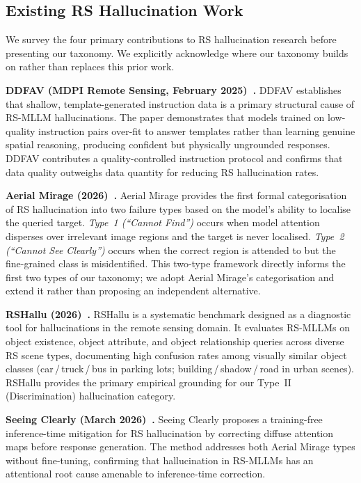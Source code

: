 \subsection{Existing RS Hallucination Work}\label{sec7:prior}

We survey the four primary contributions to RS hallucination research before
presenting our taxonomy. We explicitly acknowledge where our taxonomy builds
on rather than replaces this prior work.

\textbf{DDFAV (MDPI Remote Sensing, February 2025)~\cite{ddfav2025}.}
DDFAV establishes that shallow, template-generated instruction data is a
primary structural cause of RS-MLLM hallucinations. The paper demonstrates
that models trained on low-quality instruction pairs over-fit to answer
templates rather than learning genuine spatial reasoning, producing confident
but physically ungrounded responses. DDFAV contributes a quality-controlled
instruction protocol and confirms that data quality outweighs data quantity
for reducing RS hallucination rates.

\textbf{Aerial Mirage (2026)~\cite{aerialmirage2026}.}
Aerial Mirage provides the first formal categorisation of RS hallucination
into two failure types based on the model's ability to localise the queried
target. \textit{Type~1 (``Cannot Find'')} occurs when model attention disperses
over irrelevant image regions and the target is never localised. \textit{Type~2
(``Cannot See Clearly'')} occurs when the correct region is attended to but
the fine-grained class is misidentified. This two-type framework directly
informs the first two types of our taxonomy; we adopt Aerial Mirage's
categorisation and extend it rather than proposing an independent alternative.

\textbf{RSHallu (2026)~\cite{rshallu2026}.}
RSHallu is a systematic benchmark designed as a diagnostic tool for
hallucinations in the remote sensing domain. It evaluates RS-MLLMs on
object existence, object attribute, and object relationship queries across
diverse RS scene types, documenting high confusion rates among visually
similar object classes (car\,/\,truck\,/\,bus in parking lots;
building\,/\,shadow\,/\,road in urban scenes). RSHallu provides the
primary empirical grounding for our Type~II (Discrimination) hallucination
category.

\textbf{Seeing Clearly (March 2026)~\cite{seeingclearly2026}.}
Seeing Clearly proposes a training-free inference-time mitigation for
RS hallucination by correcting diffuse attention maps before response
generation. The method addresses both Aerial Mirage types without
fine-tuning, confirming that hallucination in RS-MLLMs has an attentional
root cause amenable to inference-time correction.

